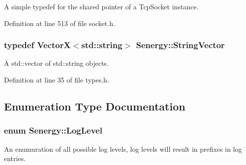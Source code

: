 A simple typedef for the shared pointer of a Tcp\-Socket instance. 



Definition at line 513 of file socket.\-h.

\hypertarget{namespace_senergy_a09aea2e19671645414361ca8388aebfe}{
\subsubsection[{String\-Vector}]{\setlength{\rightskip}{0pt plus 5cm}typedef {\bf Vector\-X}$<$std\-::string$>$ {\bf Senergy\-::\-String\-Vector}}}\label{namespace_senergy_a09aea2e19671645414361ca8388aebfe}


A std\-::vector of std\-::string objects. 



Definition at line 35 of file types.\-h.



\subsection{Enumeration Type Documentation}
\hypertarget{namespace_senergy_a8a440a300c8ecafb12b81c1853a5c66d}{
\subsubsection[{Log\-Level}]{\setlength{\rightskip}{0pt plus 5cm}enum {\bf Senergy\-::\-Log\-Level}\hspace{0.3cm}{\ttfamily [strong]}}}\label{namespace_senergy_a8a440a300c8ecafb12b81c1853a5c66d}


An enumuration of all possible log levels, log levels will result in prefixes in log entries. 

